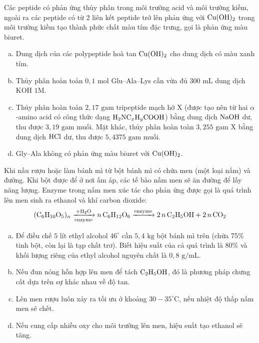 \documentclass[12pt,a4paper]{article}
\begin{document}
\begin{ex}
Các peptide có phản ứng thủy phân trong môi trường acid và môi trường kiềm, ngoài ra các peptide có từ 2 liên kết peptide trở lên phản ứng với $\ce{Cu(OH)2}$ trong môi trường kiềm tạo thành phức chất màu tím đặc trưng, gọi là phản ứng màu biuret.
\begin{enumerate}[a)]
	\item Dung dịch của các polypeptide hoà tan $\ce{Cu(OH)2}$ cho dung dịch có màu xanh tím.
	\item Thủy phân hoàn toàn $0{,}1\text{ mol}$ Glu--Ala--Lys cần vừa đủ $300\text{ mL}$ dung dịch $\text{KOH 1M}$.
	\item Thủy phân hoàn toàn $2{,}17\text{ gam}$ tripeptide mạch hở X (được tạo nên từ hai $\alpha$-amino acid có công thức dạng $\ce{H2NC_xH_yCOOH}$) bằng dung dịch $\ce{NaOH}$ dư, thu được $3{,}19\text{ gam}$ muối. Mặt khác, thủy phân hoàn toàn $3{,}255\text{ gam}$ X bằng dung dịch $\ce{HCl}$ dư, thu được $5{,}4375\text{ gam}$ muối.
	\item Gly--Ala không có phản ứng màu biuret với $\ce{Cu(OH)2}$.
\end{enumerate}
\loigiai{}
\end{ex}

\begin{ex}
Khi nấu rượu hoặc làm bánh mì từ bột bánh mì có chứa men (một loại nấm) và đường. Khi bột được để ở nơi ấm áp, các tế bào nấm men sẽ ăn đường để lấy năng lượng. Enzyme trong nấm men xúc tác cho phản ứng được gọi là quá trình lên men sinh ra ethanol và khí carbon dioxide:
\[\ce{(C6H10O5)_n} \xrightarrow[\text{enzyme}]{+\ce{H2O}} \ce{n C6H12O6} \xrightarrow{\text{enzyme}} \ce{2n C2H5OH + 2n CO2}\]
\begin{enumerate}[a)]
	\item Để điều chế $5\text{ lít}$ ethyl alcohol $46^\circ$ cần $5{,}4\text{ kg}$ bột bánh mì trên (chứa 75\% tinh bột, còn lại là tạp chất trơ). Biết hiệu suất của cả quá trình là 80\% và khối lượng riêng của ethyl alcohol nguyên chất là $0{,}8\text{ g/mL}$.
	\item Nếu đun nóng hỗn hợp lên men để tách $\ce{C2H5OH}$, đó là phương pháp chưng cất dựa trên sự khác nhau về độ tan.
	\item Lên men rượu luôn xảy ra tối ưu ở khoảng $30 - 35^\circ\text{C}$, nếu nhiệt độ thấp nấm men sẽ chết.
	\item Nếu cung cấp nhiều oxy cho môi trường lên men, hiệu suất tạo ethanol sẽ tăng.
\end{enumerate}
\loigiai{}
\end{ex}
\end{document}
